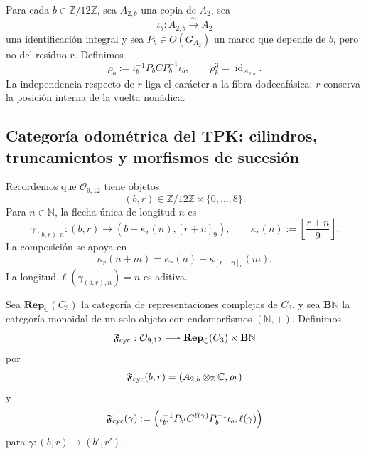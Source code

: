 {Para cada \(b\in\mathbb Z/12\mathbb Z\), sea \(A_{2,b}\) una copia de
\(A_2\), sea
\[
 \iota_b:A_{2,b}\xrightarrow{\;\sim\;}A_2
\]
una identificación integral y sea
\(P_b\in O(G_{A_2})\) un marco que depende de \(b\), pero no del residuo
\(r\). Definimos
\begin{equation}
 \rho_b:=
 \iota_b^{-1}P_bCP_b^{-1}\iota_b,
 \qquad
 \rho_b^3=\operatorname{id}_{A_{2,b}}.
 \label{p12-83-c1-s10:eq:u006b-rho-fibra}
\end{equation}
La independencia respecto de \(r\) liga el carácter a la fibra
dodecafásica; \(r\) conserva la posición interna de la vuelta nonádica.

\subsection{Categoría odométrica del TPK: cilindros, truncamientos y morfismos de sucesión}

Recordemos que \(\mathcal O_{9,12}\) tiene objetos
\[
 (b,r)\in\mathbb Z/12\mathbb Z\times\{0,\ldots,8\}.
\]
Para \(n\in\mathbb N\), la flecha única de longitud \(n\) es
\begin{equation}
 \gamma_{(b,r),n}:
 (b,r)\longrightarrow
 \left(
 b+\kappa_r(n),[r+n]_9
 \right),
 \qquad
 \kappa_r(n):=
 \left\lfloor\frac{r+n}{9}\right\rfloor.
 \label{p12-83-c1-s10:eq:u006b-flecha-odometro}
\end{equation}
La composición se apoya en
\begin{equation}
 \kappa_r(n+m)
 =\kappa_r(n)+\kappa_{[r+n]_9}(m).
 \label{p12-83-c1-s10:eq:u006b-cociclo-odometro}
\end{equation}
La longitud \(\ell(\gamma_{(b,r),n})=n\) es aditiva.

\begin{definition}
\label{p12-83-c1-s10:def:u006b-funtor-ciclotomico}
Sea \(\mathbf{Rep}_{\mathbb C}(C_3)\) la categoría de representaciones
complejas de \(C_3\), y sea \(\mathbf B\mathbb N\) la categoría monoidal
de un solo objeto con endomorfismos \((\mathbb N,+)\). Definimos
\begin{equation}
 \mathfrak F_{\rm cyc}:
 \mathcal O_{9,12}
 \longrightarrow
 \mathbf{Rep}_{\mathbb C}(C_3)\times\mathbf B\mathbb N
 \label{p12-83-c1-s10:eq:u006b-signatura-funtor}
\end{equation}
por
\[
 \mathfrak F_{\rm cyc}(b,r)
 =(A_{2,b}\otimes_{\mathbb Z}\mathbb C,\rho_b)
\]
y
\begin{equation}
 \mathfrak F_{\rm cyc}(\gamma)
 :=
 \left(
 \iota_{b'}^{-1}P_{b'}C^{\ell(\gamma)}
 P_b^{-1}\iota_b,
 \ell(\gamma)
 \right)
 \label{p12-83-c1-s10:eq:u006b-flecha-funtor}
\end{equation}
para \(\gamma:(b,r)\to(b',r')\).
\end{definition}

}
